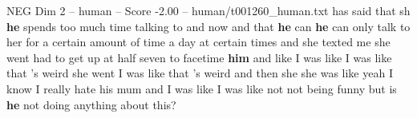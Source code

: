 \begin{textsample}{NEG Dim 2 – human – Score -2.00 – human/t001260\_human.txt}  \label{ex:f2_neg_016}
has said that sh \textbf{he} spends too much time talking to and now and that \textbf{he} can \textbf{he} can only talk to her for a certain amount of time a day at certain times and she texted me she went had to get up at half seven to facetime \textbf{him} and like I was like I was like that 's weird she went I was like that 's weird and then she she was like yeah I know I really hate his mum and I was like I was like not not being funny but is \textbf{he} not doing anything about this?

\end{textsample}
